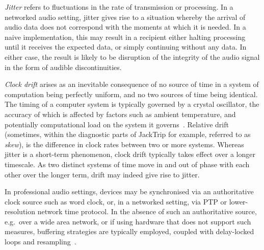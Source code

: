 \textit{Jitter} refers to fluctuations in the rate of transmission or
processing.
In a networked audio setting, jitter gives rise to a situation whereby the
arrival of audio data does not correspond with the moments at which it is
needed.
In a naive implementation, this may result in a recipient either halting
processing until it receives the expected data, or simply continuing without
any data.
In either case, the result is likely to be disruption of the integrity of the
audio signal in the form of audible discontinuities.

\textit{Clock drift} arises as an inevitable consequence of no source of time
in a system of computation being perfectly uniform, and no two sources of time
being identical.
The timing of a computer system is typically governed by a crystal oscillator,
the accuracy of which is affected by factors such as ambient temperature, and
potentially computational load on the system it
governs~\citep{marouani_internal_2008}.
Relative drift (sometimes, within the diagnostic parts of JackTrip for example,
referred to as \textit{skew}), is the difference in clock rates between two or
more systems.
Whereas jitter is a short-term phenomenon, clock drift typically takes effect
over a longer timescale.
As two distinct systems of time move in and out of phase with each other over
the longer term, drift may indeed give rise to jitter.

In professional audio settings, devices may be synchronised via an authoritative
clock source such as word clock, or, in a networked setting, via PTP or
lower-resolution network time protocol.
In the absence of such an authoritative source, e.g.\ over a wide area network,
or if using hardware that does not support such measures, buffering strategies
are typically employed, coupled with delay-locked
loops and resampling~\citep{adriaensen_using_2005, adriaensen_controlling_2012}.
